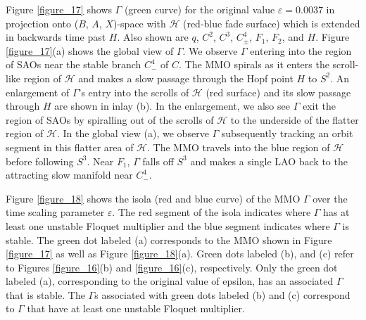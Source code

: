 \documentclass{ws-ijbc}
\begin{document}
Figure \ref{figure_17} shows $\Gamma$ (green curve) for the original value $\varepsilon=0.0037$ in projection onto ($B$, $A$, $X$)-space with $\mathscr{H}$ (red-blue fade surface) which is extended in backwards time past $H$.  Also shown are $q$, $C^2$, $C^3$, $C^4_\pm$, $F_1$, $F_2$, and $H$.  Figure \ref{figure_17}(a) shows the global view of $\Gamma$.  We observe $\Gamma$ entering into the region of SAOs near the stable branch $C^4_-$ of $C$.  The MMO spirals as it enters the scroll-like region of $\mathscr{H}$ and makes a slow passage through the Hopf point $H$ to $S^2$.  An enlargement of $\Gamma$'s entry into the scrolls of $\mathscr{H}$ (red surface) and its slow passage through $H$ are shown in inlay (b).  In the enlargement, we also see $\Gamma$ exit the region of SAOs by spiralling out of the scrolls of $\mathscr{H}$ to the underside of the flatter region of $\mathscr{H}$.  In the global view (a), we observe $\Gamma$ subsequently tracking an orbit segment in this flatter area of $\mathscr{H}$.  The MMO travels into the blue region of $\mathscr{H}$ before following $S^3$.  Near $F_1$, $\Gamma$ falls off $S^3$ and makes a single LAO back to the attracting slow manifold near $C^4_-$.

Figure \ref{figure_18} shows the isola (red and blue curve) of the MMO $\Gamma$ over the time scaling parameter $\varepsilon$.  The red segment of the isola indicates where $\Gamma$ has at least one unstable Floquet multiplier and the blue segment indicates where $\Gamma$ is stable.  The green dot labeled (a) corresponds to the MMO shown in Figure \ref{figure_17} as well as Figure \ref{figure_18}(a).  Green dots labeled (b), and (c) refer to Figures \ref{figure_16}(b) and  \ref{figure_16}(c), respectively.  Only the green dot labeled (a), corresponding to the original value of epsilon, has an associated $\Gamma$ that is stable.  The $\Gamma$s associated with green dots labeled (b) and (c) correspond to $\Gamma$ that have at least one unstable Floquet multiplier.
\end{document}
